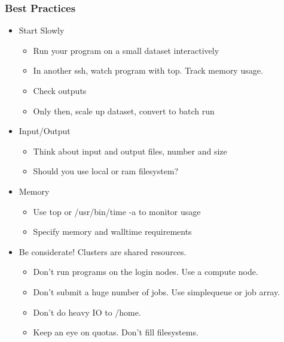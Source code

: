 \documentclass[10pt]{beamer}
\begin{document}
\begin{frame}[fragile]
\frametitle{Best Practices}

\begin{itemize}
\item Start Slowly
\begin{itemize}
\item Run your program on a small dataset interactively
\item In another ssh, watch program with top.  Track memory usage.
\item Check outputs
\item Only then, scale up dataset, convert to batch run
\end{itemize}
\item Input/Output
\begin{itemize}
\item Think about input and output files, number and size
\item Should you use local or ram filesystem? 
\end{itemize}
\item Memory

\begin{itemize}
\item Use top or /usr/bin/time -a to monitor usage
\item Specify memory and walltime requirements
\end{itemize}

\item Be considerate!  Clusters are shared resources.

\begin{itemize}
\item Don't run programs on the login nodes.  Use a compute node.
\item Don't submit a huge number of jobs.  Use simplequeue or job array.
\item Don't do heavy IO to /home.
\item Keep an eye on quotas.  Don't fill filesystems.
\end{itemize}
\end{itemize}

\end{frame}
\end{document}
